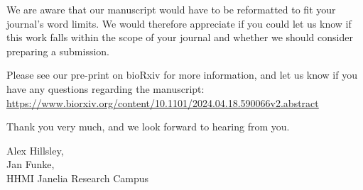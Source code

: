 \documentclass{article}
\begin{document}
We are aware that our manuscript would have to be reformatted to fit your
journal's word limits. We would therefore appreciate if you could let us know
if this work falls within the scope of your journal and whether we should
consider preparing a submission.

Please see our pre-print on bioRxiv for more information, and let us know if
you have any questions regarding the manuscript:
\url{https://www.biorxiv.org/content/10.1101/2024.04.18.590066v2.abstract}

Thank you very much, and we look forward to hearing from you.

\vspace{5mm}
Alex Hillsley,\\
Jan Funke,\\
HHMI Janelia Research Campus
\end{document}
